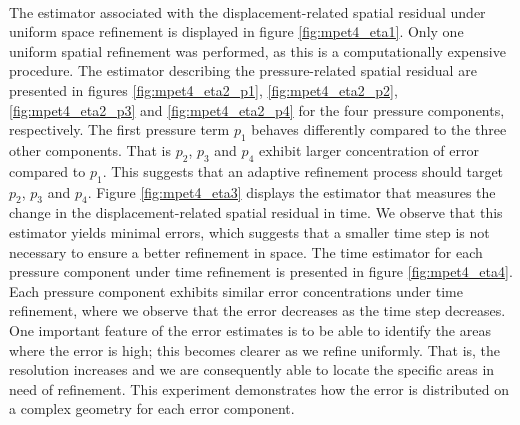 \mbox{}\\
The estimator associated with the displacement-related spatial residual under uniform space refinement is displayed in figure \ref{fig:mpet4_eta1}. Only one uniform spatial refinement was performed, as this is a computationally expensive procedure. The estimator describing the pressure-related spatial residual are presented in figures \ref{fig:mpet4_eta2_p1}, \ref{fig:mpet4_eta2_p2}, \ref{fig:mpet4_eta2_p3} and \ref{fig:mpet4_eta2_p4} for the four pressure components, respectively. The first pressure term $p_1$ behaves differently compared to the three other components. That is $p_2$, $p_3$ and $p_4$ exhibit larger concentration of error compared to $p_1$. This suggests that an adaptive refinement process should target $p_2$, $p_3$ and $p_4$. Figure \ref{fig:mpet4_eta3} displays the estimator that measures the change in the displacement-related spatial residual in time. We observe that this estimator yields minimal errors, which suggests that a smaller time step is not necessary to ensure a better refinement in space. The time estimator for each pressure component under time refinement is presented in figure \ref{fig:mpet4_eta4}. Each pressure component exhibits similar error concentrations under time refinement, where we observe that the error decreases as the time step decreases. One important feature of the error estimates is to be able to identify the areas where the error is high; this becomes clearer as we refine uniformly. That is, the resolution increases and we are consequently able to locate the specific areas in need of refinement. This experiment demonstrates how the error is distributed on a complex geometry for each error component. 
